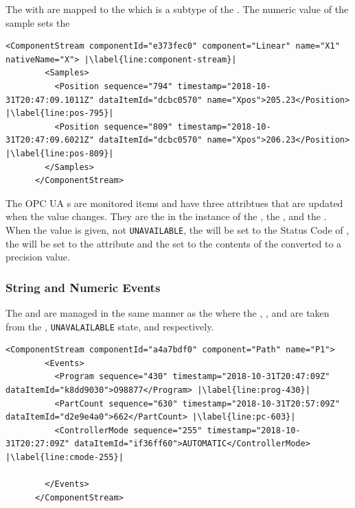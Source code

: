The  with   are mapped to the  which is a subtype of the  . The numeric value of the sample sets the  

\begin{lstlisting}[firstnumber=last,escapechar=|,%
    caption={Linear Component Stream},label={lst:linear-component-stream}]
      <ComponentStream componentId="e373fec0" component="Linear" name="X1" nativeName="X"> |\label{line:component-stream}|
        <Samples>
          <Position sequence="794" timestamp="2018-10-31T20:47:09.1011Z" dataItemId="dcbc0570" name="Xpos">205.23</Position> |\label{line:pos-795}|
          <Position sequence="809" timestamp="2018-10-31T20:47:09.6021Z" dataItemId="dcbc0570" name="Xpos">206.23</Position> |\label{line:pos-809}|
        </Samples>
      </ComponentStream>
\end{lstlisting}

The OPC UA s are monitored items and have three attribtues that are updated when the value changes. They are the  in the instance of the , the , and the . When the value is given, not \texttt{UNAVAILABLE}, the  will be set to the Status Code of , the  will be set to the  attribute and the  set to the contents of the  converted to a  precision value.

\subsubsection{String and Numeric Events}\label{sec:sting-numeric-events}

The  and   are managed in the same manner as the  where the , , and  are taken from the , \texttt{UNAVALAILABLE} state, and  respectively.

\begin{lstlisting}[firstnumber=last,escapechar=|,%
    caption={Path Component Stream},label={lst:path-component-stream}]
      <ComponentStream componentId="a4a7bdf0" component="Path" name="P1">
        <Events>
          <Program sequence="430" timestamp="2018-10-31T20:47:09Z" dataItemId="k8dd9030">O98877</Program> |\label{line:prog-430}|
          <PartCount sequence="630" timestamp="2018-10-31T20:57:09Z" dataItemId="d2e9e4a0">662</PartCount> |\label{line:pc-603}|
          <ControllerMode sequence="255" timestamp="2018-10-31T20:27:09Z" dataItemId="if36ff60">AUTOMATIC</ControllerMode> |\label{line:cmode-255}|

        </Events>
      </ComponentStream>
\end{lstlisting}

